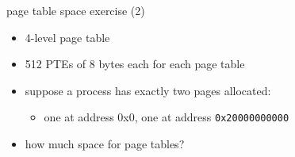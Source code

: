 \begin{frame}{page table space exercise (2)}
\begin{itemize}
\item 4-level page table
\item 512 PTEs of 8 bytes each for each page table
\vspace{.5cm}
\item suppose a process has exactly two pages allocated:
    \begin{itemize}
    \item one at address 0x0, one at address {\tt 0x20000000000}
    \end{itemize}
\item how much space for page tables?
\iftoggle{heldback}{}{
    \item<2-> 1 shared first-level PT, with two valid entries
    \item<2-> two second-level PTs, each with one valid entry
    \item<2-> two third-level PTs, each with one valid entry
    \item<2-> two fourth-level PTs, each with one valid entry
}
\end{itemize}
\end{frame}

